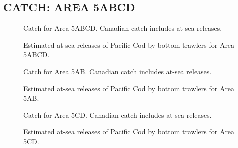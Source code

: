 \documentclass[11pt]{book}
\begin{document}
\hypertarget{catch-area-5abcd}{%
\subsection{CATCH: AREA 5ABCD}\label{catch-area-5abcd}}
\begin{figure}[htb]

{\centering {} 

}

\caption{Catch for Area 5ABCD. Canadian catch includes at-sea releases.}\label{fig:fig-catch-5abcd}
\end{figure}
\begin{figure}[htb]

{\centering {} 

}

\caption{Estimated at-sea releases of Pacific Cod by bottom trawlers for Area 5ABCD.}\label{fig:fig-discards-5abcd}
\end{figure}
\begin{figure}[htb]

{\centering {} 

}

\caption{Catch for Area 5AB. Canadian catch includes at-sea releases.}\label{fig:fig-catch-5ab}
\end{figure}
\begin{figure}[htb]

{\centering {} 

}

\caption{Estimated at-sea releases of Pacific Cod by bottom trawlers for Area 5AB.}\label{fig:fig-discards-5ab}
\end{figure}
\begin{figure}[htb]

{\centering {} 

}

\caption{Catch for Area 5CD. Canadian catch includes at-sea releases.}\label{fig:fig-catch-5cd}
\end{figure}
\begin{figure}[htb]

{\centering {} 

}

\caption{Estimated at-sea releases of Pacific Cod by bottom trawlers for Area 5CD.}\label{fig:fig-discards-5cd}
\end{figure}
\clearpage
\end{document}

